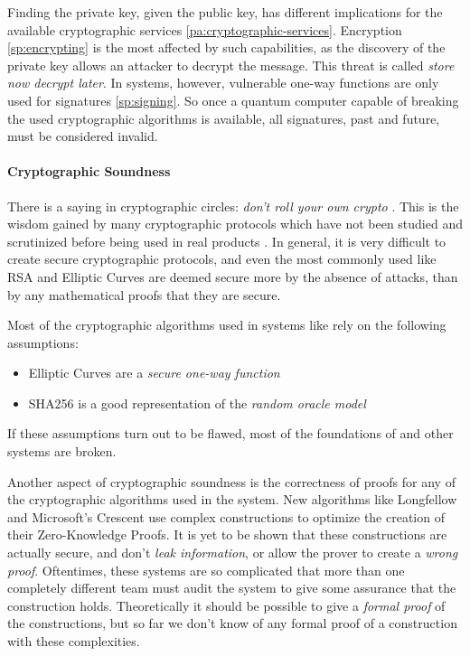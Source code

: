 Finding the private key, given the public key, has different implications for
the available cryptographic services \ref{pa:cryptographic-services}.
Encryption \ref{sp:encrypting} is the most affected by such capabilities, as the discovery
of the private key allows an attacker to decrypt the message.
This threat is called \emph{store now decrypt later}.
In \eid systems, however, vulnerable one-way functions are only used for
signatures \ref{sp:signing}.
So once a quantum computer capable of breaking the used cryptographic algorithms is
available, all signatures, past and future, must be considered invalid.

\paragraph{Cryptographic Soundness}

There is a saying in cryptographic circles: \emph{don't roll your own crypto} \cite{SchneierLaw11}.
This is the wisdom gained by many cryptographic protocols which have not been
studied and scrutinized before being used in real products \cite{Vaudenay02}.
In general, it is very difficult to create secure cryptographic protocols, and even
the most commonly used like RSA and Elliptic Curves are deemed secure more by the
absence of attacks, than by any mathematical proofs that they are secure.

Most of the cryptographic algorithms used in \eid systems like \swiyu rely on the
following assumptions:
\begin{itemize}
    \item Elliptic Curves are a \emph{secure one-way function}
    \item SHA256 is a good representation of the \emph{random oracle model}
\end{itemize}
If these assumptions turn out to be flawed, most of the foundations of \eid and other systems
are broken.

Another aspect of cryptographic soundness is the correctness of proofs for any of the cryptographic
algorithms used in the system.
New algorithms like Longfellow \cite{FS24} and Microsoft's Crescent \cite{FFL25} use complex constructions to optimize the creation of their
Zero-Knowledge Proofs.
It is yet to be shown that these constructions are actually secure, and don't 
\emph{leak information}, or allow the prover to create a \emph{wrong proof}.
Oftentimes, these systems are so complicated that more than one completely different team must audit the system to give some assurance that the construction holds.
Theoretically it should be possible to give a \emph{formal proof} of the constructions,
but so far we don't know of any formal proof of a construction with these
complexities.

